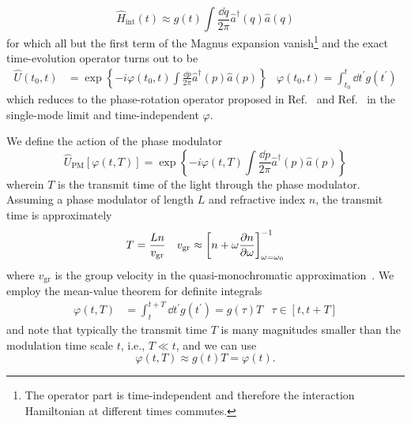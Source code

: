 \begin{equation}
	\hat{H}_\text{int}(t)
	\approx
	g(t)
	\int\frac{\dd{q}}{2\pi}
	\hat{a}^\dagger(q)
	\hat{a}(q)
\end{equation}
for which all but the first term of the Magnus expansion vanish\footnote{The operator part is time-independent and therefore the interaction Hamiltonian at different times commutes.} and the exact time-evolution operator turns out to be
\begin{align}
	\hat{U}(t_0,t)
	&=
	\exp\left\{
		-i\varphi(t_0,t)
		\int\frac{\dd{p}}{2\pi}
		\hat{a}^\dagger(p)
		\hat{a}(p)
	\right\}
	&
	\varphi(t_0,t)
	=
	\int_{t_0}^{t}\dd{t^\prime}
	g(t^\prime)
\end{align}
which reduces to the phase-rotation operator proposed in Ref.~\cite[p.~38]{Leonhardt2010} and Ref.~\cite[p.~103]{Vogel2006} in the single-mode limit and time-independent $\varphi$.

We define the action of the phase modulator
\begin{equation}
	\hat{U}_\text{PM}\left[\varphi(t,T)\right]
	=
	\exp\left\{
		-i\varphi(t,T)
		\int\frac{\dd{p}}{2\pi}
		\hat{a}^\dagger(p)
		\hat{a}(p)
	\right\}
\end{equation}
wherein $T$ is the transmit time of the light through the phase modulator.
Assuming a phase modulator of length $L$ and refractive index $n$, the transmit time is approximately
\begin{align}
	T
	&=
	\frac{Ln}{v_\text{gr}}
	&
	v_\text{gr}
	\approx
	\left[
		n
		+
		\omega
		\pdv{n}{\omega}
	\right]_{\omega=\omega_0}^{-1}
\end{align}
where $v_\text{gr}$ is the group velocity in the quasi-monochromatic approximation~\cite[p.~211]{Jackson2007}.
We employ the mean-value theorem for definite integrals
\begin{align}
	\varphi(t,T)
	&=
	\int_{t}^{t+T}\dd{t^\prime}
	g(t^\prime)
	=
	g(\tau)
	T
	&
	\tau\in[t,t+T]
\end{align}
and note that typically the transmit time $T$ is many magnitudes smaller than the modulation time scale $t$, i.e., $T\ll t$, and we can use
\begin{equation}
	\varphi(t,T)
	\approx
	g(t)
	T
	=
	\varphi(t)
	.
\end{equation}

